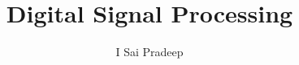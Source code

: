 \documentclass[journal,12pt,twocolumn]{IEEEtran}
\begin{document}

\def\putbox#1#2#3{\makebox[0in][l]{\makebox[#1][l]{}\raisebox{\baselineskip}[0in][0in]{\raisebox{#2}[0in][0in]{#3}}}}
     \def\rightbox#1{\makebox[0in][r]{#1}}
     \def\centbox#1{\makebox[0in]{#1}}
     \def\topbox#1{\raisebox{-\baselineskip}[0in][0in]{#1}}
     \def\midbox#1{\raisebox{-0.5\baselineskip}[0in][0in]{#1}}

\vspace{3cm}

\title{ 
Digital Signal Processing
}


%
%
%

\author{I Sai Pradeep%
}
% 
%
\end{document}
